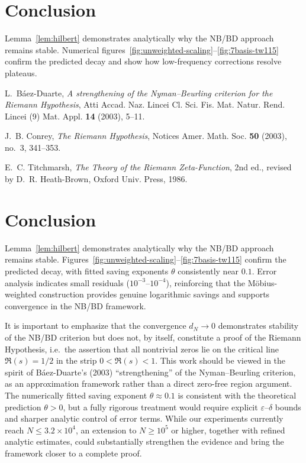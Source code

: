 \documentclass[11pt]{article}
\theoremstyle{remark}
\begin{document}
\section{Conclusion}
Lemma~\ref{lem:hilbert} demonstrates analytically why the NB/BD approach remains stable. Numerical figures~\ref{fig:unweighted-scaling}--\ref{fig:7basis-tw115} confirm the predicted decay and show how low-frequency corrections resolve plateaus.

\begin{thebibliography}{9}

L.~B\'aez-Duarte, \emph{A strengthening of the Nyman--Beurling criterion for the Riemann Hypothesis}, Atti Accad. Naz. Lincei Cl. Sci. Fis. Mat. Natur. Rend. Lincei (9) Mat. Appl. \textbf{14} (2003), 5--11.

J.~B. Conrey, \emph{The Riemann Hypothesis}, Notices Amer. Math. Soc. \textbf{50} (2003), no.~3, 341--353.

E.~C. Titchmarsh, \emph{The Theory of the Riemann Zeta-Function}, 2nd ed., revised by D.~R. Heath-Brown, Oxford Univ. Press, 1986.



\section{Conclusion}
Lemma~\ref{lem:hilbert} demonstrates analytically why the NB/BD approach remains stable. 
Figures~\ref{fig:unweighted-scaling}--\ref{fig:7basis-tw115} confirm the predicted decay, with fitted saving exponents $\theta$ consistently near $0.1$. 
Error analysis indicates small residuals ($10^{-3}$–$10^{-4}$), reinforcing that the M\"obius-weighted construction provides genuine logarithmic savings and supports convergence in the NB/BD framework.

It is important to emphasize that the convergence $d_N \to 0$ demonstrates stability of the NB/BD criterion but does not, by itself, constitute a proof of the Riemann Hypothesis, i.e.\ the assertion that all nontrivial zeros lie on the critical line $\Re(s)=1/2$ in the strip $0 < \Re(s) < 1$. 
This work should be viewed in the spirit of B\'aez-Duarte's (2003) ``strengthening'' of the Nyman--Beurling criterion, as an approximation framework rather than a direct zero-free region argument. 
The numerically fitted saving exponent $\theta \approx 0.1$ is consistent with the theoretical prediction $\theta > 0$, but a fully rigorous treatment would require explicit $\varepsilon$--$\delta$ bounds and sharper analytic control of error terms. 
While our experiments currently reach $N \leq 3.2\times 10^{4}$, an extension to $N \geq 10^{5}$ or higher, together with refined analytic estimates, could substantially strengthen the evidence and bring the framework closer to a complete proof.

\end{thebibliography}
\end{document}

